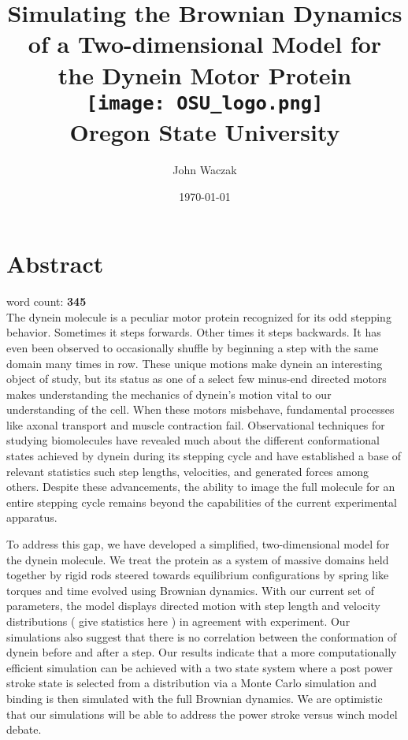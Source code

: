 \documentclass[12pt]{report}
\title{
	{Simulating the Brownian Dynamics of a Two-dimensional Model for the Dynein Motor Protein}\vspace{1.5em}\\
	\texttt{[image: OSU\_logo.png]}\vspace{0.5em}\\
	\large{Oregon State University}
}
\author{John Waczak}
\date{\today}
\begin{document}
	\onehalfspacing
	
	\maketitle
	\chapter*{Abstract}
	\vspace{-3 em}word count: \textbf{345}\\
	
	The dynein molecule is a peculiar motor protein recognized for its odd stepping behavior. Sometimes it steps forwards. Other times it steps backwards. It has even been observed to occasionally shuffle by beginning a step with the same domain many times in row. These unique motions make dynein an interesting object of study, but its status as one of a select few minus-end directed motors makes understanding the mechanics of dynein’s motion vital to our understanding of the cell. When these motors misbehave, fundamental processes like axonal transport and muscle contraction fail. Observational techniques for studying biomolecules have revealed much about the different conformational states achieved by dynein during its stepping cycle and have established a base of relevant statistics such step lengths, velocities, and generated forces among others. Despite these advancements, the ability to image the full molecule for an entire stepping cycle remains beyond the capabilities of the current experimental apparatus. 
	
	To address this gap, we have developed a simplified, two-dimensional model for the dynein molecule. We treat the protein as a system of massive domains held together by rigid rods steered towards equilibrium configurations by spring like torques and time evolved using Brownian dynamics. With our current set of parameters, the model displays directed motion with step length and velocity distributions ( give statistics here ) in agreement with experiment. Our simulations also suggest that there is no correlation between the conformation of dynein before and after a step. Our results indicate that a more computationally efficient simulation can be achieved with a two state system where a post power stroke state is selected from a distribution via a Monte Carlo simulation and binding is then simulated with the full Brownian dynamics. We are optimistic that our simulations will be able to address the power stroke versus winch model debate. 
	
\end{document}
